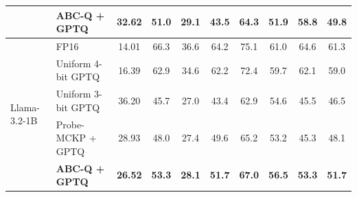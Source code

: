 \begin{table}[t]
{\begin{tabular}{llcccccccc}
 & \textbf{ABC-Q + GPTQ} & \textbf{32.62} & \textbf{51.0} & \textbf{29.1} & \textbf{43.5} & 64.3 & \textbf{51.9} & \textbf{58.8} & \textbf{49.8} \\
\midrule
\multirow{5}{*}{Llama-3.2-1B} & FP16 & 14.01 & 66.3 & 36.6 & 64.2 & 75.1 & 61.0 & 64.6 & 61.3 \\
 & Uniform 4-bit GPTQ & 16.39 & 62.9 & 34.6 & 62.2 & 72.4 & 59.7 & 62.1 & 59.0 \\
 & Uniform 3-bit GPTQ & 36.20 & 45.7 & 27.0 & 43.4 & 62.9 & 54.6 & 45.5 & 46.5 \\
 & Probe-MCKP + GPTQ & 28.93 & 48.0 & 27.4 & 49.6 & 65.2 & 53.2 & 45.3 & 48.1 \\
 & \textbf{ABC-Q + GPTQ} & \textbf{26.52} & \textbf{53.3} & \textbf{28.1} & \textbf{51.7} & \textbf{67.0} & \textbf{56.5} & \textbf{53.3} & \textbf{51.7} \\
\bottomrule
\end{tabular}}
\end{table}
